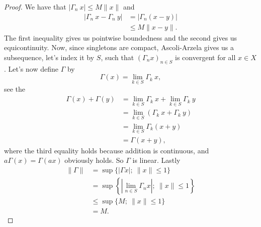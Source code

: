 \documentclass[a4paper,12pt,twoside,BCOR=10mm]{scrbook}
\begin{document}
\begin{proof}
We have that $|\Gamma_n\ x| \leq M \|x\|$ and
\begin{align*}
	|\Gamma_n\ x - \Gamma_n\ y|
	&= |\Gamma_n (x - y)|\\
	&\leq M\|x - y\|.
\end{align*}
The first inequality gives us pointwise boundedness and the second gives us equicontinuity.
Now, since singletons are compact, Ascoli-Arzela gives us a subsequence, let's index it by $S$, such that $(\Gamma_n x)_{n \in S}$ is convergent for all $x \in X$. %
Let's now define $\Gamma$ by
\[
	\Gamma(x) = \lim_{k \in S} \Gamma_k\ x,
\]
see the
\begin{align*}
	\Gamma(x) + \Gamma(y)
	&= \lim_{k \in S} \Gamma_k\ x + \lim_{k \in S} \Gamma_k\ y\\
	&= \lim_{k \in S} \left ( \Gamma_k\ x + \Gamma_k\ y \right )\\
	&= \lim_{k \in S} \Gamma_k(x + y)\\
	&= \Gamma(x + y),
\end{align*}
where the third equality holds because addition is continuous, and $a\Gamma(x) = \Gamma(ax)$ obviously holds.
So $\Gamma$ is linear.
Lastly
\begin{align*}
	\|\Gamma\|
	&= \sup \{|\Gamma x|;\ \|x\| \leq 1\}\\
	&= \sup \left \{ \left |\lim_{n \in S} \Gamma_n x \right|;\ \|x\| \leq 1 \right \}\\
	&\leq \sup \{ M;\ \|x\| \leq 1 \}\\
	&= M.
\end{align*}
\end{proof}
\end{document}
